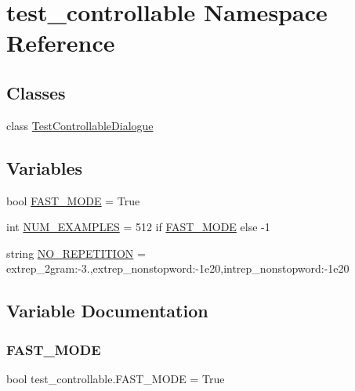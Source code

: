 \hypertarget{namespacetest__controllable}{}\section{test\+\_\+controllable Namespace Reference}
\label{namespacetest__controllable}
\subsection*{Classes}
\begin{DoxyCompactItemize}
\item 
class \hyperlink{classtest__controllable_1_1TestControllableDialogue}{Test\+Controllable\+Dialogue}
\end{DoxyCompactItemize}
\subsection*{Variables}
\begin{DoxyCompactItemize}
\item 
bool \hyperlink{namespacetest__controllable_ad2c8c083bae98c16daef9da4b2494618}{F\+A\+S\+T\+\_\+\+M\+O\+DE} = True
\item 
int \hyperlink{namespacetest__controllable_a7482064eb69e2d38391c4be1fc81e234}{N\+U\+M\+\_\+\+E\+X\+A\+M\+P\+L\+ES} = 512 if \hyperlink{namespacetest__controllable_ad2c8c083bae98c16daef9da4b2494618}{F\+A\+S\+T\+\_\+\+M\+O\+DE} else -\/1
\item 
string \hyperlink{namespacetest__controllable_aab6d0af3084ea9ec5a2deb23ae724eb3}{N\+O\+\_\+\+R\+E\+P\+E\+T\+I\+T\+I\+ON} = \textquotesingle{}extrep\+\_\+2gram\+:-\/3.,extrep\+\_\+nonstopword\+:-\/1e20,intrep\+\_\+nonstopword\+:-\/1e20\textquotesingle{}
\end{DoxyCompactItemize}


\subsection{Variable Documentation}
\mbox{\label{namespacetest__controllable_ad2c8c083bae98c16daef9da4b2494618}} 
\subsubsection{\texorpdfstring{F\+A\+S\+T\+\_\+\+M\+O\+DE}{FAST\_MODE}}
{\footnotesize\ttfamily bool test\+\_\+controllable.\+F\+A\+S\+T\+\_\+\+M\+O\+DE = True}

